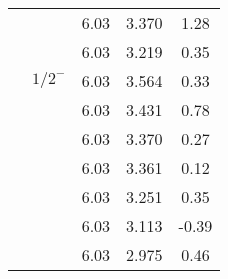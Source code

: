 \documentclass[prd,twocolumn,floatfix,nofootinbib]{revtex4}
\begin{document}
\begin{table*}[!htbp]
\begin{tabular}{ccccc}
            &               &6.03   &3.370  &1.28 \\
            &               &6.03   &3.219  &0.35 \\
            &${1/2}^{-}$    &6.03   &3.564  &0.33 \\
            &               &6.03   &3.431  &0.78 \\
            &               &6.03   &3.370  &0.27 \\
            &               &6.03   &3.361  &0.12 \\
            &               &6.03   &3.251  &0.35 \\
            &               &6.03   &3.113  &-0.39 \\
            &               &6.03   &2.975  &0.46 \\  
        \hline\hline
    \end{tabular}
\end{table*}
\end{document}
